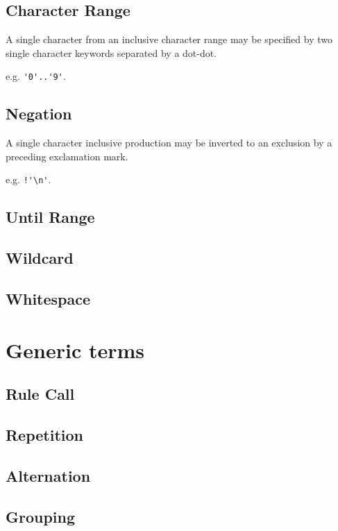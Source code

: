 \subsection{Character Range}

A single character from an inclusive character range may be specified by two single character keywords separated by a dot-dot.

e.g. \verb|'0'..'9'|.

\subsection{Negation}

A single character inclusive production may be inverted to an exclusion by a preceding exclamation mark.

e.g. \verb|!'\n'|.

\subsection{Until Range}

\subsection{Wildcard}

\subsection{Whitespace}


\section{Generic terms}

\subsection{Rule Call}

\subsection{Repetition}

\subsection{Alternation}

\subsection{Grouping}


